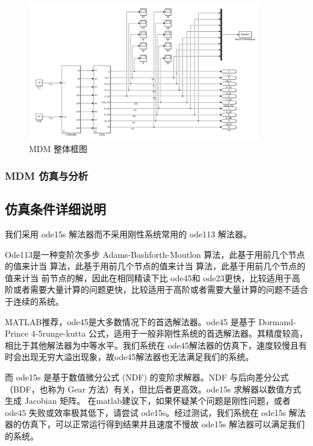 \begin{itemize}
	\begin{figure}[htbp]
		\centering
		\includegraphics[width=0.9\textwidth]{fig/simulink/MDM_simulink1.png}
		\caption{MDM 整体框图}\label{fig:MDM_simulink}
	\end{figure}
	
	\subsubsection{MDM 仿真与分析}
	
	\clearpage
	\subsection{仿真条件详细说明} 
	
	我们采用 ode15s 解法器而不采用刚性系统常用的 ode113 解法器。 
	
	Ode113是一种变阶次多步 Adams-Bashforth-Moutlon 算法，此基于用前几个节点的值来计当 算法，此基于用前几个节点的值来计当 算法，此基于用前几个节点的值来计当 前节点的解，因此在相同精读下比 ode45和 ode23更快，比较适用于高阶或者需要大量计算的问题更快，比较适用于高阶或者需要大量计算的问题不适合于连续的系统。
	
	MATLAB推荐，ode45是大多数情况下的首选解法器。ode45 是基于 Dormand-Prince 4-5runge-kutta 公式，适用于一般非刚性系统的首选解法器。其精度较高，相比于其他解法器为中等水平。我们系统在 ode45解法器的仿真下，速度较慢且有时会出现无穷大溢出现象，故ode45解法器也无法满足我们的系统。
	
	而 ode15s 是基于数值微分公式 (NDF) 的变阶求解器。NDF 与后向差分公式（BDF，也称为 Gear 方法）有关，但比后者更高效。ode15s 求解器以数值方式生成 Jacobian 矩阵。
	在matlab建议下，如果怀疑某个问题是刚性问题，或者 ode45 失败或效率极其低下，请尝试 ode15s。经过测试，我们系统在 ode15s 解法器的仿真下，可以正常运行得到结果并且速度不慢故 ode15s 解法器可以满足我们的系统。
	
\end{itemize}
